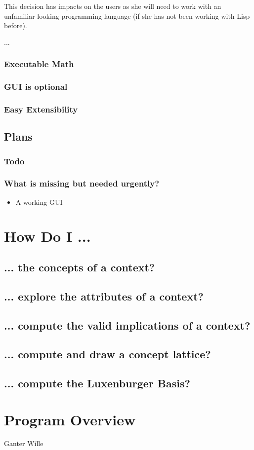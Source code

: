 \documentclass{scrbook}
\theoremstyle{plain}
\theoremstyle{plain}
\theoremstyle{plain}
\theoremstyle{nonumberplain}
\begin{document}
This decision has impacts on the users as she will need to work with
an unfamiliar looking programming language (if she has not been
working with Lisp before).

...

\subsection{Executable Math}

\subsection{GUI is optional}

\subsection{Easy Extensibility}


\section{Plans}

\subsection{Todo}

\subsection{What is missing but needed urgently?}

\begin{itemize}
\item A working GUI
\end{itemize}

\chapter{How Do I ...}

\section{... the concepts of a context?}
\section{... explore the attributes of a context?}
\section{... compute the valid implications of a context?}
\section{... compute and draw a concept lattice?}
\section{... compute the Luxenburger Basis?}

\chapter{Program Overview}

\appendix

\begin{thebibliography}{xxxxxxx}
 Ganter Wille
\end{thebibliography}
\end{document}
